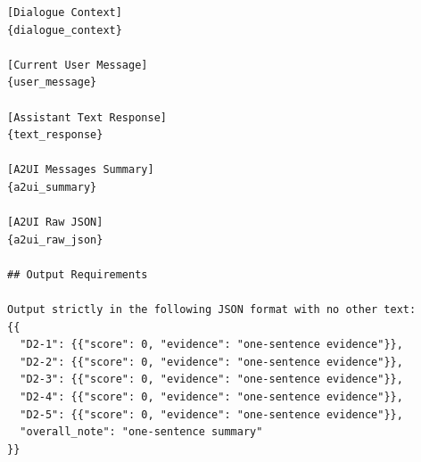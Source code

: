 \documentclass{llmxive}
\begin{document}
\begin{verbatim}
[Dialogue Context]
{dialogue_context}

[Current User Message]
{user_message}

[Assistant Text Response]
{text_response}

[A2UI Messages Summary]
{a2ui_summary}

[A2UI Raw JSON]
{a2ui_raw_json}

## Output Requirements

Output strictly in the following JSON format with no other text:
{{
  "D2-1": {{"score": 0, "evidence": "one-sentence evidence"}},
  "D2-2": {{"score": 0, "evidence": "one-sentence evidence"}},
  "D2-3": {{"score": 0, "evidence": "one-sentence evidence"}},
  "D2-4": {{"score": 0, "evidence": "one-sentence evidence"}},
  "D2-5": {{"score": 0, "evidence": "one-sentence evidence"}},
  "overall_note": "one-sentence summary"
}}
\end{verbatim}
\end{document}
